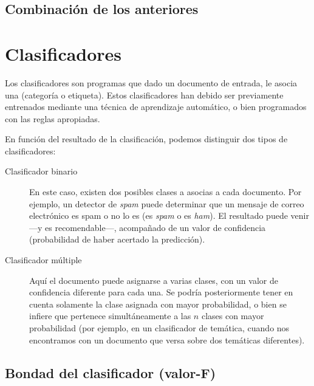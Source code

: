 
\subsection{Combinación de los anteriores}


\section{Clasificadores}

Los clasificadores son programas que dado un documento de entrada, le asocia una  (categoría o etiqueta). Estos clasificadores han debido ser previamente entrenados mediante una técnica de aprendizaje automático, o bien programados con las reglas apropiadas.

En función del resultado de la clasificación, podemos distinguir dos tipos de clasificadores:
\nopagebreak
\begin{description}
\item[Clasificador binario] En este caso, existen dos posibles clases a asocias a cada documento. Por ejemplo, un detector de \emph{spam} puede determinar que un mensaje de correo electrónico es spam o no lo es (es \emph{spam} o es \emph{ham}). El resultado puede venir ---y es recomendable---, acompañado de un valor de confidencia (probabilidad de haber acertado la predicción).
\item[Clasificador múltiple] Aquí el documento puede asignarse a varias clases, con un valor de confidencia diferente para cada una. Se podría posteriormente tener en cuenta solamente la clase asignada con mayor probabilidad, o bien se infiere que pertenece simultáneamente a las $n$ clases con mayor probabilidad (por ejemplo, en un clasificador de temática, cuando nos encontramos con un documento que versa sobre dos temáticas diferentes).
\end{description}


\subsection{Bondad del clasificador (valor-F)}

